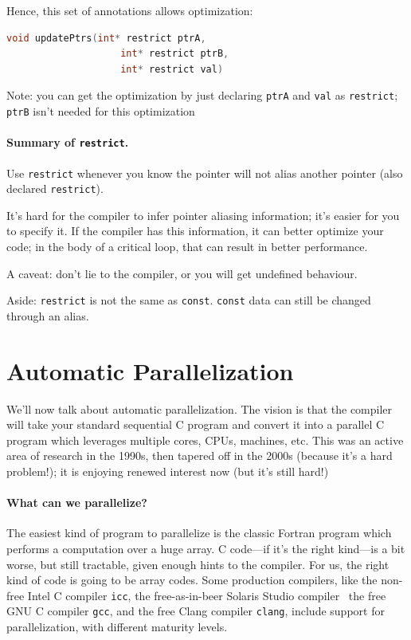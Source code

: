 \documentclass[a4paper]{report}
\begin{document}
Hence, this set of annotations allows optimization:
\begin{lstlisting}[language=C]
    void updatePtrs(int* restrict ptrA, 
                    int* restrict ptrB,
                    int* restrict val)
\end{lstlisting}
Note: you can get the optimization by just declaring {\tt ptrA} and
      {\tt val} as {\tt restrict}; {\tt ptrB} isn't needed for this optimization

\paragraph{Summary of {\tt restrict}.}
Use {\tt restrict} whenever you know the pointer will not alias
another pointer (also declared {\tt restrict}).

It's hard for the compiler to infer pointer aliasing information;
it's easier for you to specify it. If the compiler has this information,
it can better optimize your code; in the body of a critical loop, that
can result in better performance.

A caveat: don't lie to the compiler, or you will get undefined behaviour.

Aside: {\tt restrict} is not the same as {\tt const}. {\tt const} data can still be
changed through an alias.



\section*{Automatic Parallelization}

We'll now talk about automatic parallelization. The vision is that the compiler will take
your standard sequential C program and convert it into a parallel C
program which leverages multiple cores, CPUs, machines, etc.  This was
an active area of research in the 1990s, then tapered off in the 2000s
(because it's a hard problem!); it is enjoying renewed interest now (but
it's still hard!)

\paragraph{What can we parallelize?} The
easiest kind of program to parallelize is the classic Fortran program
which performs a computation over a huge array. C code---if it's the
right kind---is a bit worse, but still tractable, given enough hints
to the compiler. For us, the right kind of code is going to be array
codes. Some production compilers, like the non-free Intel C compiler
{\tt icc}, the free-as-in-beer Solaris Studio
compiler~\cite{solarisstudio}
the free GNU C compiler {\tt gcc}, and the free Clang compiler {\tt clang}, include support for
parallelization, with different maturity levels.
\end{document}
